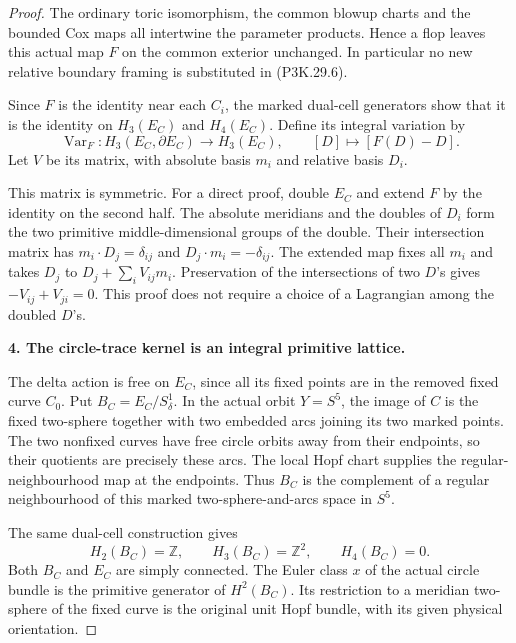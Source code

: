 \begin{proof}
The ordinary toric isomorphism, the common blowup charts and
the bounded Cox maps all intertwine the parameter products.
Hence a flop leaves this actual map \(F\) on the common
exterior unchanged. In particular no new relative boundary
framing is substituted in (P3K.29.6).

Since \(F\) is the identity near each \(C_i\), the marked
dual-cell generators show that it is the identity on
\(H_3(E_C)\) and \(H_4(E_C)\). Define its integral variation by
\[
 \operatorname{Var}_F:H_3(E_C,\partial E_C)\longrightarrow
 H_3(E_C),\qquad [D]\longmapsto[F(D)-D].
                                                        \tag{P3K.29.8}
\]
Let \(V\) be its matrix, with absolute basis \(m_i\) and
relative basis \(D_i\).

This matrix is symmetric. For a direct proof, double \(E_C\)
and extend \(F\) by the identity on the second half. The
absolute meridians and the doubles of \(D_i\) form the two
primitive middle-dimensional groups of the double. Their
intersection matrix has \(m_i\cdot D_j=\delta_{ij}\) and
\(D_j\cdot m_i=-\delta_{ij}\). The extended map fixes all
\(m_i\) and takes \(D_j\) to \(D_j+\sum_iV_{ij}m_i\).
Preservation of the intersections of two \(D\)'s gives
\(-V_{ij}+V_{ji}=0\). This proof does not require a choice
of a Lagrangian among the doubled \(D\)'s.

\par\medskip\noindent\textbf{4. The circle-trace kernel is an integral primitive lattice.}\enspace

The delta action is free on \(E_C\), since all its fixed points
are in the removed fixed curve \(C_0\). Put
\(B_C=E_C/S^1_\delta\). In the actual orbit \(Y=S^5\), the
image of \(C\) is the fixed two-sphere together with two
embedded arcs joining its two marked points. The two
nonfixed curves have free circle orbits away from their
endpoints, so their quotients are precisely these arcs.
The local Hopf chart supplies the regular-neighbourhood
map at the endpoints. Thus \(B_C\) is the complement of a
regular neighbourhood of this marked two-sphere-and-arcs
space in \(S^5\).

The same dual-cell construction gives
\[
 H_2(B_C)=\mathbb Z,\qquad H_3(B_C)=\mathbb Z^2,\qquad
 H_4(B_C)=0.
                                                        \tag{P3K.29.9}
\]
Both \(B_C\) and \(E_C\) are simply connected. The Euler
class \(x\) of the actual circle bundle is the primitive
generator of \(H^2(B_C)\). Its restriction to a meridian
two-sphere of the fixed curve is the original unit Hopf
bundle, with its given physical orientation.


\end{proof}
